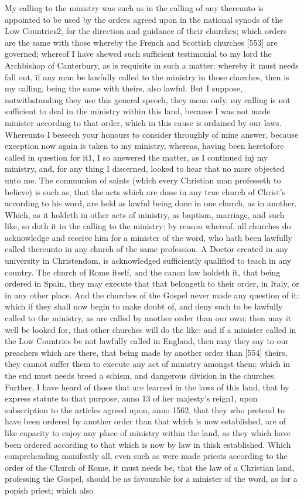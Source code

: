 My calling to the ministry was such as in the calling of any thereunto is appointed to be used by the orders agreed upon in the national synods of the Low Countries2, for the direction and guidance of their churches; which orders are the same with those whereby the French and Scottish churches [553] are governed; whereof I have shewed such sufficient testimonial to my lord the Archbishop of Canterbury, as is requisite in such a matter: whereby it must needs fall out, if any man be lawfully called to the ministry in those churches, then is my calling, being the same with theirs, also lawful. But I suppose, notwithstanding they use this general speech, they mean only, my calling is not sufficient to deal in the ministry within this land, because I was not made minister according to that order, which in this cause is ordained by our laws. Whereunto I beseech your honours to consider throughly of mine answer, because exception now again is taken to my ministry, whereas, having been heretofore called in question for it1, I so answered the matter, as I continued inj my ministry, and, for any thing I discerned, looked to hear that no more objected unto me. The communion of saints (which every Christian man professeth to believe) is such as, that the acts which are done in any true church of Christ’s according to his word, are held as lawful being done in one church, as in another. Which, as it holdeth in other acts of ministry, as baptism, marriage, and such like, so doth it in the calling to the ministry; by reason whereof, all churches do acknowledge and receive him for a minister of the word, who hath been lawfully called thereunto in any church of the same profession. A Doctor created in any university in Christendom, is acknowledged sufficiently qualified to teach in any country. The church of Rome itself, and the canon law holdeth it, that being ordered in Spain, they may execute that that belongeth to their order, in Italy, or in any other place. And the churches of the Gospel never made any question of it: which if they shall now begin to make doubt of, and deny such to be lawfully called to the ministry, as are called by another order than our own; then may it well be looked for, that other churches will do the like: and if a minister called in the Low Countries be not lawfully called in England, then may they say to our preachers which are there, that being made by another order than [554] theirs, they cannot suffer them to execute any act of ministry amongst them; which in the end must needs breed a schism, and dangerous division in the churches. Further, I have heard of those that are learned in the laws of this land, that by express statute to that purpose, anno 13 of her majesty’s reign1, upon subscription to the articles agreed upon, anno 1562, that they who pretend to have been ordered by another order than that which is now established, are of like capacity to enjoy any place of ministry within the land, as they which have been ordered according to that which is now by law in thisk established. Which comprehending manifestly all, even such as were made priests according to the order of the Church of Rome, it must needs be, that the law of a Christian land, professing the Gospel, should be as favourable for a minister of the word, as for a popish priest; which also 